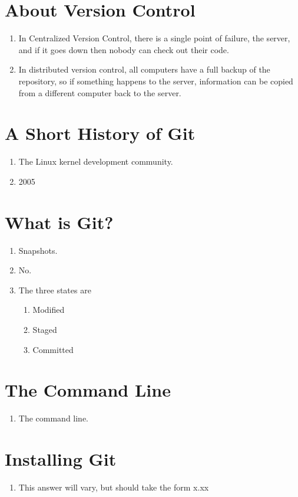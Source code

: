 \section{About Version Control}
\begin{enumerate}
    \item In Centralized Version Control, there is a single point of
        failure, the server, and if it goes down then nobody can check out
        their code.
    \item In distributed version control, all computers have a full backup
        of the repository, so if something happens to the server,
        information can be copied from a different computer back to the
        server.
\end{enumerate}

\section{A Short History of Git}
\begin{enumerate}
    \item The Linux kernel development community.
    \item 2005
\end{enumerate}

\section{What is Git?}
\begin{enumerate}
    \item Snapshots.
    \item No.
    \item The three states are
        \begin{enumerate}
            \item Modified
            \item Staged
            \item Committed
        \end{enumerate}
\end{enumerate}

\section{The Command Line}
\begin{enumerate}
    \item The command line.
\end{enumerate}

\section{Installing Git}
\begin{enumerate}
    \item This answer will vary, but should take the form x.xx
\end{enumerate}

